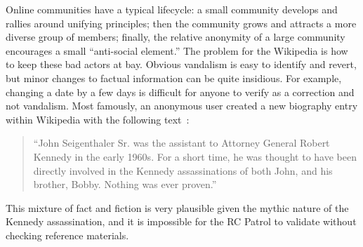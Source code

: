 Online communities have a typical lifecycle:
a small community develops and rallies around unifying principles;
then the community grows and attracts a more diverse group of members;
finally, the relative anonymity of a large community encourages
a small ``anti-social element.''
The problem for the Wikipedia is how to keep these bad actors at bay.
Obvious vandalism is easy to identify and revert,
but minor changes to factual information can be quite insidious.
For example, changing a date by a few days is difficult for anyone
to verify as a correction and not vandalism.
Most famously, an anonymous user created a new biography entry
within Wikipedia with the following
text~\cite{Seigenthaler05,NewYorkTimes05a,NewYorkTimes05b}:
\begin{quote}
``John Seigenthaler Sr. was the assistant to
Attorney General Robert Kennedy in the early 1960s.
For a short time, he was thought to have been directly involved
in the Kennedy assassinations of both John, and his brother, Bobby.
Nothing was ever proven.''
\end{quote}
This mixture of fact and fiction is very plausible given the
mythic nature of the Kennedy assassination, and it is impossible
for the RC Patrol to validate without checking reference materials.

